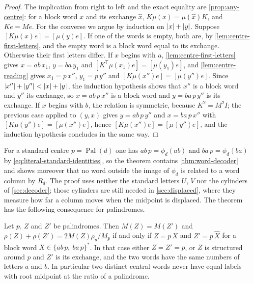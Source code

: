 \begin{proof}
The implication from right to left and the exact equality are \cref{prop:any-centre}: for a block
word $x$ and its exchange $\widehat x$, $K\mu(x)=\mu(\widehat x)K$, and $Ke=Me$. For the converse we
argue by induction on $\lvert x\rvert+\lvert y\rvert$. Suppose $[K\mu(x)e]=[\mu(y)e]$. If one of the words is empty,
both are, by \cref{lem:centre-first-letters}, and the empty word is a block word equal to its
exchange. Otherwise their first letters differ. If $x$ begins with $a$,
\cref{lem:centre-first-letters} gives $x=ab\,x_1$, $y=ba\,y_1$ and
$[K^{\mathsf T}\mu(x_1)e]=[\mu(y_1)e]$, and \cref{lem:centre-reading} gives $x_1=p\,x''$,
$y_1=p\,y''$ and $[K\mu(x'')e]=[\mu(y'')e]$. Since $\lvert x''\rvert+\lvert y''\rvert<\lvert x\rvert+\lvert y\rvert$, the
induction hypothesis shows that $x''$ is a block word and $y''$ its exchange, so $x=ab\,p\,x''$ is a
block word and $y=ba\,p\,y''$ is its exchange. If $x$ begins with $b$, the relation is symmetric,
because $K^2=M^2I$; the previous case applied to $(y,x)$ gives $y=ab\,p\,y''$ and $x=ba\,p\,x''$ with
$[K\mu(y'')e]=[\mu(x'')e]$, hence $[K\mu(x'')e]=[\mu(y'')e]$, and the induction hypothesis concludes
in the same way.
\end{proof}

For a standard centre $p=\operatorname{Pal}(d)$ one has $ab\,p=\phi_d(ab)$ and $ba\,p=\phi_d(ba)$ by
\eqref{eq:literal-standard-identities}, so the theorem contains \cref{thm:word-decoder} and shows
moreover that no word outside the image of $\phi_d$ is related to a word column by $R_d$. The proof
uses neither the standard letters $U$, $V$ nor the cylinders of \cref{sec:decoder}; those cylinders
are still needed in \cref{sec:displaced}, where they measure how far a column moves when the
midpoint is displaced. The theorem has the following consequence for palindromes.

\begin{corollary}
\label{cor:centre-classification}
Let $p$, $Z$ and $Z'$ be palindromes. Then $M(Z)=M(Z')$ and $\rho(Z)+\rho(Z')=2M(Z)\rho_p/M_p$ if and
only if $Z=p\,X$ and $Z'=p\,\widehat X$ for a block word $X\in\{ab\,p,\ ba\,p\}^*$. In that case either
$Z=Z'=p$, or $Z$ is structured around $p$ and $Z'$ is its exchange, and the two words have the same
numbers of letters $a$ and $b$. In particular two distinct central words never have equal labels
with root midpoint at the ratio of a palindrome.
\end{corollary}

